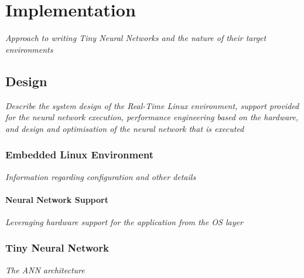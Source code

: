\part{Implementation}

\textit{Approach to writing Tiny Neural Networks and the nature of their target environments}

\chapter{Design}
\textit{Describe the system design of the Real-Time Linux environment, support provided for the neural network execution, performance engineering based on the hardware, and design and optimisation of the neural network that is executed}

\section[Embedded Operating System]{Embedded Linux Environment}
\textit{Information regarding configuration and other details}

\subsection{Neural Network Support}
\textit{Leveraging hardware support for the application from the OS layer}

\section{Tiny Neural Network}
\textit{The ANN architecture}
